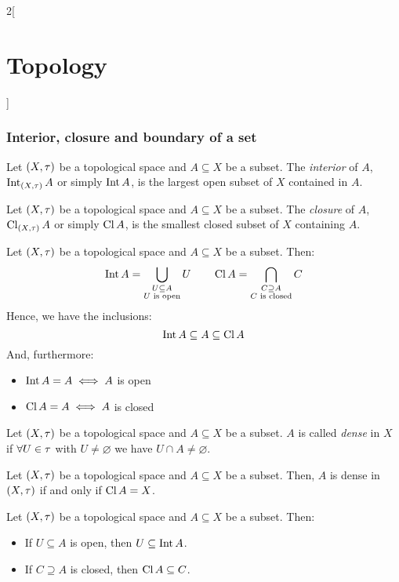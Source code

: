 \documentclass[../../../main.tex]{subfiles}
\begin{document}
\begin{multicols}{2}[\section{Topology}]
  \subsubsection{Interior, closure and boundary of a set}
  \begin{definition}[Interior]
    Let $(X,\tau)$ be a topological space and $A\subseteq X$ be a subset. The \textit{interior} of $A$, $\operatorname{Int}_{(X,\tau)} A$ or simply $\operatorname{Int} A$, is the largest open subset of $X$ contained in $A$.
  \end{definition}
  \begin{definition}[Closure]
    Let $(X,\tau)$ be a topological space and $A\subseteq X$ be a subset. The \textit{closure} of $A$, $\operatorname{Cl}_{(X,\tau)} A$ or simply $\operatorname{Cl} A$, is the smallest closed subset of $X$ containing $A$.
  \end{definition}
  \begin{prop}
    Let $(X,\tau)$ be a topological space and $A\subseteq X$ be a subset. Then: $$\operatorname{Int} A=\bigcup_{\substack{U\subseteq A\\U\text{ is open}}}U\qquad\operatorname{Cl} A=\bigcap_{\substack{C\supseteq A\\C\text{ is closed}}}C$$
    Hence, we have the inclusions: $$\operatorname{Int} A\subseteq A\subseteq \operatorname{Cl} A$$
    And, furthermore:
    \begin{itemize}
      \item $\operatorname{Int} A=A\iff A$ is open
      \item $\operatorname{Cl} A=A\iff A$ is closed
    \end{itemize}
  \end{prop}
  \begin{definition}
    Let $(X,\tau)$ be a topological space and $A\subseteq X$ be a subset. $A$ is called \textit{dense} in $X$ if $\forall U\in\tau$ with $U\ne\varnothing$ we have $U\cap A\ne\varnothing$.
  \end{definition}
  \begin{prop}
    Let $(X,\tau)$ be a topological space and $A\subseteq X$ be a subset. Then, $A$ is dense in $(X,\tau)$ if and only if $\operatorname{Cl} A=X$.
  \end{prop}
  \begin{prop}
    Let $(X,\tau)$ be a topological space and $A\subseteq X$ be a subset. Then:
    \begin{itemize}
      \item If $U\subseteq A$ is open, then $U\subseteq\operatorname{Int} A$.
      \item If $C\supseteq A$ is closed, then $\operatorname{Cl} A\subseteq C$.
    \end{itemize}

\end{prop}
\end{multicols}
\end{document}
